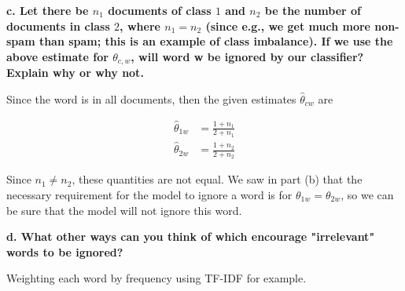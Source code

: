{\textbf{c. Let there be $n_1$ documents of class $1$ and $n_2$ be the number of
documents in class $2$, where $n_1 = n_2$ (since e.g., we get much more
non-spam than spam; this is an example of class imbalance). If we use the above
estimate for $\theta_{c,w}$, will word w be ignored by our classifier? Explain
why or why not.}

Since the word is in all documents, then the given estimates
$\hat{\theta}_{cw}$ are

\begin{align}
    \hat{\theta}_{1w} & = \frac{1+n_1}{2+n_1} \\
    \hat{\theta}_{2w} & = \frac{1+n_2}{2+n_2}
\end{align}

Since $n_1 \neq n_2$, these quantities are not equal. We saw in part (b) that
the necessary requirement for the model to ignore a word is for
$\theta_{1w} = \theta_{2w}$, so we can be sure that the model will not ignore
this word.

\textbf{d. What other ways can you think of which encourage "irrelevant"
words to be ignored?}

Weighting each word by frequency using TF-IDF for example.

}

